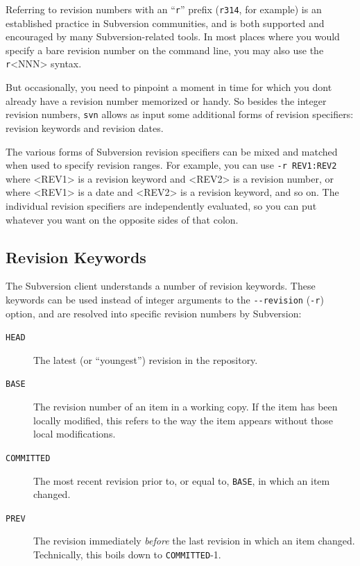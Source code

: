 Referring to revision numbers with an ``\texttt{r}'' prefix
(\texttt{r314}, for example) is an established practice in Subversion
communities, and is both supported and encouraged by many
Subversion-related tools. In most places where you would specify a bare
revision number on the command line, you may also use the
\texttt{r}\textless NNN\textgreater{} syntax.

But occasionally, you need to pinpoint a moment in time for which you
don\textquotesingle t already have a revision number memorized or handy.
So besides the integer revision numbers, \texttt{svn} allows as input
some additional forms of revision specifiers: revision keywords and
revision dates.

The various forms of Subversion revision specifiers can be mixed and
matched when used to specify revision ranges. For example, you can use
\texttt{-r\ REV1:REV2} where \textless REV1\textgreater{} is a revision
keyword and \textless REV2\textgreater{} is a revision number, or where
\textless REV1\textgreater{} is a date and \textless REV2\textgreater{}
is a revision keyword, and so on. The individual revision specifiers are
independently evaluated, so you can put whatever you want on the
opposite sides of that colon.

\subsection{Revision Keywords}\label{svn.tour.revs.keywords}

The Subversion client understands a number of revision keywords. These
keywords can be used instead of integer arguments to the
\texttt{-\/-revision} (\texttt{-r}) option, and are resolved into
specific revision numbers by Subversion:

\begin{description}
\item[\texttt{HEAD}]
The latest (or ``youngest'') revision in the repository.
\item[\texttt{BASE}]
The revision number of an item in a working copy. If the item has been
locally modified, this refers to the way the item appears without those
local modifications.
\item[\texttt{COMMITTED}]
The most recent revision prior to, or equal to, \texttt{BASE}, in which
an item changed.
\item[\texttt{PREV}]
The revision immediately \emph{before} the last revision in which an
item changed. Technically, this boils down to \texttt{COMMITTED}-1.
\end{description}

